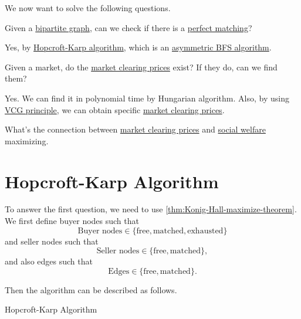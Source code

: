 We now want to solve the following questions.
\begin{problem}
Given a \href{https://en.wikipedia.org/wiki/Bipartite_graph}{bipartite graph}, can we check if there is a \hyperref[def:perfect-matching]{perfect matching}?
\end{problem}
\begin{answer}
	Yes, by \hyperref[sec:Hopcroft-Karp-algorithm]{Hopcroft-Karp algorithm}, which is an \underline{asymmetric BFS algorithm}.
\end{answer}

\begin{problem}
Given a market, do the \hyperref[note:market-clearing-prices]{market clearing prices} exist? If they do, can we find them?
\end{problem}
\begin{answer}
	Yes. We can find it in polynomial time by Hungarian algorithm. Also, by using \hyperref[thm:VCG]{VCG principle},
	we can obtain specific \hyperref[note:market-clearing-prices]{market clearing prices}.
\end{answer}

\begin{problem}
What's the connection between \hyperref[note:market-clearing-prices]{market clearing prices} and \hyperref[def:social-welfare]{social welfare}
maximizing.
\end{problem}

\section{Hopcroft-Karp Algorithm}\label{sec:Hopcroft-Karp-algorithm}
To answer the first question, we need to use \autoref{thm:Konig-Hall-maximize-theorem}. We first define buyer nodes such that
\[
	\text{Buyer nodes}\in \{\text{free}, \text{matched}, \text{exhausted}   \}
\]
and seller nodes such that
\[
	\text{Seller nodes}\in \{\text{free}, \text{matched}\},
\]
and also edges such that
\[
	\text{Edges}\in \{\text{free}, \text{matched}\}.
\]

Then the algorithm can be described as follows.

\par{}
\begin{algorithm}[H]\label{algo:Hopcroft-Karp-algo}
	\DontPrintSemicolon
	\caption{Hopcroft-Karp Algorithm}
	\KwData{}
	\KwResult{}
	\BlankLine

\end{algorithm}

